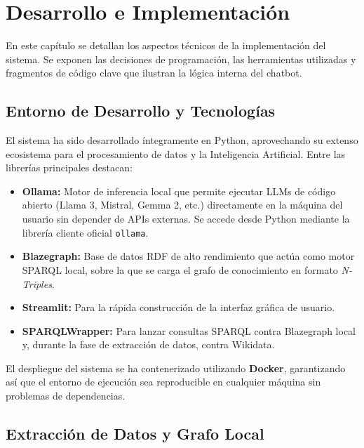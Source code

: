 
\chapter{Desarrollo e Implementación}
\label{cap:implementacion}

En este capítulo se detallan los aspectos técnicos de la implementación del sistema. Se exponen las decisiones de programación, las herramientas utilizadas y fragmentos de código clave que ilustran la lógica interna del chatbot.

\section{Entorno de Desarrollo y Tecnologías}

El sistema ha sido desarrollado íntegramente en Python, aprovechando su extenso ecosistema para el procesamiento de datos y la Inteligencia Artificial. Entre las librerías principales destacan:
\begin{itemize}
    \item \textbf{Ollama:} Motor de inferencia local que permite ejecutar LLMs de código abierto (Llama 3, Mistral, Gemma 2, etc.) directamente en la máquina del usuario sin depender de APIs externas. Se accede desde Python mediante la librería cliente oficial \texttt{ollama}.
    \item \textbf{Blazegraph:} Base de datos RDF de alto rendimiento que actúa como motor SPARQL local, sobre la que se carga el grafo de conocimiento en formato \textit{N-Triples}.
    \item \textbf{Streamlit:} Para la rápida construcción de la interfaz gráfica de usuario.
    \item \textbf{SPARQLWrapper:} Para lanzar consultas SPARQL contra Blazegraph local y, durante la fase de extracción de datos, contra Wikidata.
\end{itemize}

El despliegue del sistema se ha contenerizado utilizando \textbf{Docker}, garantizando así que el entorno de ejecución sea reproducible en cualquier máquina sin problemas de dependencias.

\section{Extracción de Datos y Grafo Local}

